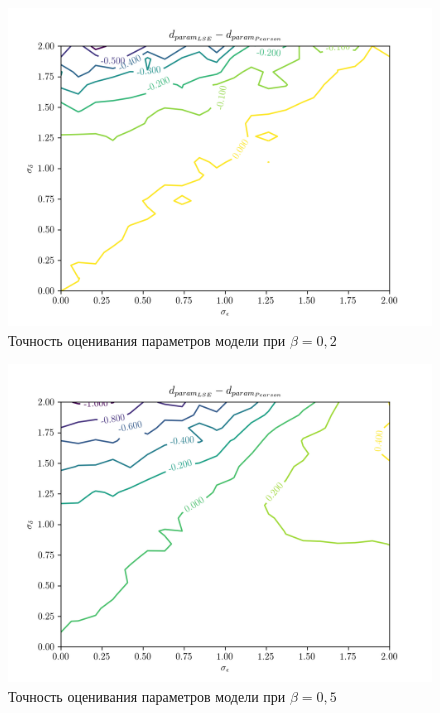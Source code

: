 \begin{figure}[h]
  \centering
  \includegraphics[width=150mm]{fig/linear/param/beta-0,2_param.png}
  \caption{Точность оценивания параметров модели при \( \beta = 0{,}2 \)}
\end{figure}

\begin{figure}[h]
  \centering
  \includegraphics[width=150mm]{fig/linear/param/beta-0,5_param.png}
  \caption{Точность оценивания параметров модели при \( \beta = 0{,}5 \)}
\end{figure}

